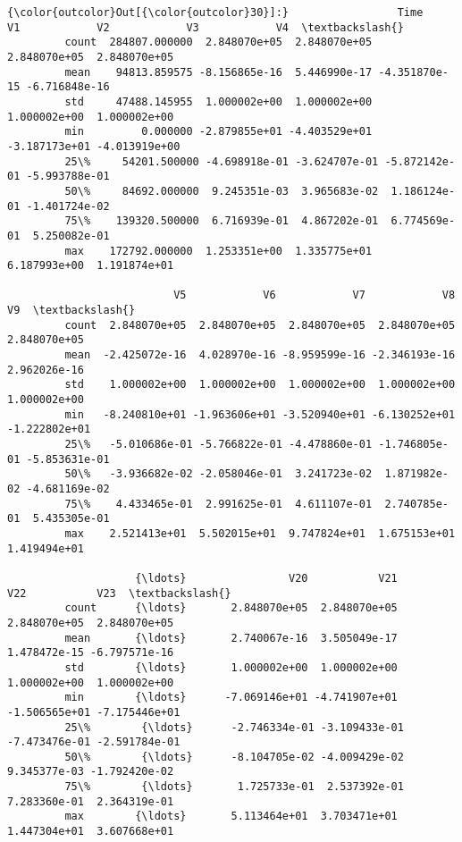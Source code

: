 \documentclass[11pt]{article}
\begin{document}
\begin{Verbatim}[commandchars=\\\{\}]
{\color{outcolor}Out[{\color{outcolor}30}]:}                 Time            V1            V2            V3            V4  \textbackslash{}
         count  284807.000000  2.848070e+05  2.848070e+05  2.848070e+05  2.848070e+05   
         mean    94813.859575 -8.156865e-16  5.446990e-17 -4.351870e-15 -6.716848e-16   
         std     47488.145955  1.000002e+00  1.000002e+00  1.000002e+00  1.000002e+00   
         min         0.000000 -2.879855e+01 -4.403529e+01 -3.187173e+01 -4.013919e+00   
         25\%     54201.500000 -4.698918e-01 -3.624707e-01 -5.872142e-01 -5.993788e-01   
         50\%     84692.000000  9.245351e-03  3.965683e-02  1.186124e-01 -1.401724e-02   
         75\%    139320.500000  6.716939e-01  4.867202e-01  6.774569e-01  5.250082e-01   
         max    172792.000000  1.253351e+00  1.335775e+01  6.187993e+00  1.191874e+01   
         
                          V5            V6            V7            V8            V9  \textbackslash{}
         count  2.848070e+05  2.848070e+05  2.848070e+05  2.848070e+05  2.848070e+05   
         mean  -2.425072e-16  4.028970e-16 -8.959599e-16 -2.346193e-16  2.962026e-16   
         std    1.000002e+00  1.000002e+00  1.000002e+00  1.000002e+00  1.000002e+00   
         min   -8.240810e+01 -1.963606e+01 -3.520940e+01 -6.130252e+01 -1.222802e+01   
         25\%   -5.010686e-01 -5.766822e-01 -4.478860e-01 -1.746805e-01 -5.853631e-01   
         50\%   -3.936682e-02 -2.058046e-01  3.241723e-02  1.871982e-02 -4.681169e-02   
         75\%    4.433465e-01  2.991625e-01  4.611107e-01  2.740785e-01  5.435305e-01   
         max    2.521413e+01  5.502015e+01  9.747824e+01  1.675153e+01  1.419494e+01   
         
                    {\ldots}                V20           V21           V22           V23  \textbackslash{}
         count      {\ldots}       2.848070e+05  2.848070e+05  2.848070e+05  2.848070e+05   
         mean       {\ldots}       2.740067e-16  3.505049e-17  1.478472e-15 -6.797571e-16   
         std        {\ldots}       1.000002e+00  1.000002e+00  1.000002e+00  1.000002e+00   
         min        {\ldots}      -7.069146e+01 -4.741907e+01 -1.506565e+01 -7.175446e+01   
         25\%        {\ldots}      -2.746334e-01 -3.109433e-01 -7.473476e-01 -2.591784e-01   
         50\%        {\ldots}      -8.104705e-02 -4.009429e-02  9.345377e-03 -1.792420e-02   
         75\%        {\ldots}       1.725733e-01  2.537392e-01  7.283360e-01  2.364319e-01   
         max        {\ldots}       5.113464e+01  3.703471e+01  1.447304e+01  3.607668e+01   
         

\end{Verbatim}
\end{document}
